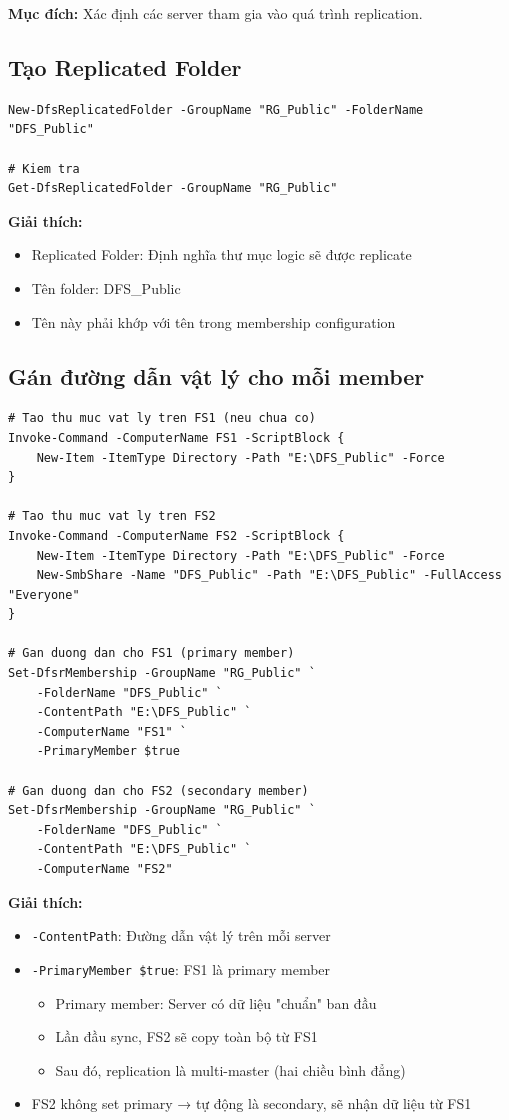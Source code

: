 \textbf{Mục đích:} Xác định các server tham gia vào quá trình replication.

\subsection{Tạo Replicated Folder}

\begin{lstlisting}
New-DfsReplicatedFolder -GroupName "RG_Public" -FolderName "DFS_Public"

# Kiem tra
Get-DfsReplicatedFolder -GroupName "RG_Public"
\end{lstlisting}

\textbf{Giải thích:}
\begin{itemize}
    \item Replicated Folder: Định nghĩa thư mục logic sẽ được replicate
    \item Tên folder: DFS\_Public
    \item Tên này phải khớp với tên trong membership configuration
\end{itemize}

\subsection{Gán đường dẫn vật lý cho mỗi member}

\begin{lstlisting}
# Tao thu muc vat ly tren FS1 (neu chua co)
Invoke-Command -ComputerName FS1 -ScriptBlock {
    New-Item -ItemType Directory -Path "E:\DFS_Public" -Force
}

# Tao thu muc vat ly tren FS2
Invoke-Command -ComputerName FS2 -ScriptBlock {
    New-Item -ItemType Directory -Path "E:\DFS_Public" -Force
    New-SmbShare -Name "DFS_Public" -Path "E:\DFS_Public" -FullAccess "Everyone"
}

# Gan duong dan cho FS1 (primary member)
Set-DfsrMembership -GroupName "RG_Public" `
    -FolderName "DFS_Public" `
    -ContentPath "E:\DFS_Public" `
    -ComputerName "FS1" `
    -PrimaryMember $true

# Gan duong dan cho FS2 (secondary member)
Set-DfsrMembership -GroupName "RG_Public" `
    -FolderName "DFS_Public" `
    -ContentPath "E:\DFS_Public" `
    -ComputerName "FS2"
\end{lstlisting}

\textbf{Giải thích:}
\begin{itemize}
    \item \texttt{-ContentPath}: Đường dẫn vật lý trên mỗi server
    \item \texttt{-PrimaryMember \$true}: FS1 là primary member
    \begin{itemize}
        \item Primary member: Server có dữ liệu "chuẩn" ban đầu
        \item Lần đầu sync, FS2 sẽ copy toàn bộ từ FS1
        \item Sau đó, replication là multi-master (hai chiều bình đẳng)
    \end{itemize}
    \item FS2 không set primary → tự động là secondary, sẽ nhận dữ liệu từ FS1
\end{itemize}

